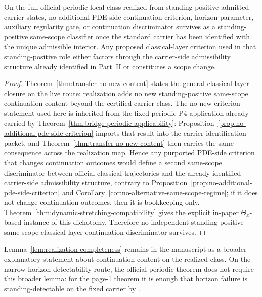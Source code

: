 \begin{manualtheorem}
\label{thm:no-independent-classical-discriminator}
On the full official periodic local class realized from standing-positive admitted carrier states, no additional PDE-side continuation criterion, horizon parameter, auxiliary regularity gate, or continuation discriminator survives as a standing-positive same-scope classifier once the standard carrier has been identified with the unique admissible interior. Any proposed classical-layer criterion used in that standing-positive role either factors through the carrier-side admissibility structure already identified in Part~II or constitutes a scope change.
\end{manualtheorem}

\begin{proof}
Theorem~\ref{thm:transfer-no-new-content} states the general classical-layer closure on the live route: realization adds no new standing-positive same-scope continuation content beyond the certified carrier class. The no-new-criterion statement used here is inherited from the fixed-periodic P4 application already carried by Theorem~\ref{thm:bridge-periodic-applicability}: Proposition~\ref{prop:no-additional-pde-side-criterion} imports that result into the carrier-identification packet, and Theorem~\ref{thm:transfer-no-new-content} then carries the same consequence across the realization map. Hence any purported PDE-side criterion that changes continuation outcomes would define a second same-scope discriminator between official classical trajectories and the already identified carrier-side admissibility structure, contrary to Proposition~\ref{prop:no-additional-pde-side-criterion} and Corollary~\ref{cor:no-alternative-same-scope-regime}; if it does not change continuation outcomes, then it is bookkeeping only. Theorem~\ref{thm:dynamic-stretching-compatibility} gives the explicit in-paper $\Theta_x$-based instance of this dichotomy. Therefore no independent standing-positive same-scope classical-layer continuation discriminator survives.
\end{proof}

\begin{remark}
Lemma~\ref{lem:realization-completeness} remains in the manuscript as a broader explanatory statement about continuation content on the realized class. On the narrow horizon-detectability route, the official periodic theorem does not require this broader lemma: for the page-1 theorem it is enough that horizon failure is standing-detectable on the fixed carrier by \HorizonDetectabilityRef{}.
\end{remark}

